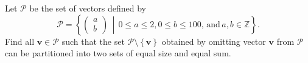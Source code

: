 Let $\mathcal{P}$ be the set of vectors defined by \[\mathcal{P}=\left\{\begin{pmatrix}a\\b\end{pmatrix}\,\middle\vert\,0\leq a\leq 2,0\leq b\leq100,\,\text{and}\,a,b\in\mathbb{Z}\right\}.\] Find all $\mathbf{v}\in\mathcal{P}$ such that the set $\mathcal{P}\setminus\left\{\mathbf{v}\right\}$ obtained by omitting vector $\mathbf{v}$ from $\mathcal{P}$ can be partitioned into two sets of equal size and equal sum.